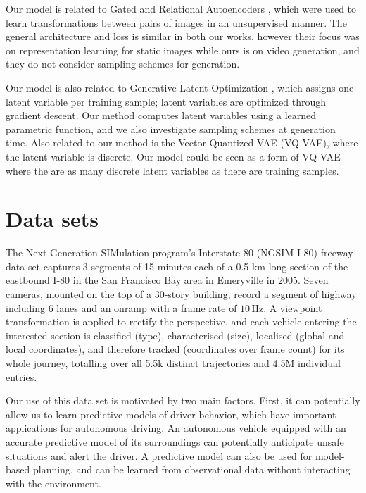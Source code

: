 \documentclass{article}
\begin{document}
Our model is related to Gated and Relational Autoencoders \citep{RelationalAE, GAE}, which were used to learn transformations between pairs of images in an unsupervised manner.
The general architecture and loss is similar in both our works, however their focus was on representation learning for static images while ours is on video generation, and they do not consider sampling schemes for generation.

Our model is also related to Generative Latent Optimization \citep{GLO}, which assigns one latent variable per training sample; latent variables are optimized through gradient descent.
Our method computes latent variables using a learned parametric function, and we also investigate sampling schemes at generation time.
Also related to our method is the Vector-Quantized VAE \citep{VQVAE} (VQ-VAE), where the latent variable is discrete.
Our model could be seen as a form of VQ-VAE where the are as many discrete latent variables as there are training samples.

\section{Data sets}

The Next Generation SIMulation program's Interstate 80 (NGSIM I-80) freeway data set \cite{halkias2006ngsim} captures 3 segments of 15 minutes each of a 0.5 km long section of the eastbound I-80 in the San Francisco Bay area in Emeryville in 2005.
Seven cameras, mounted on the top of a 30-story building, record a segment of highway including 6 lanes and an onramp with a frame rate of $10\,\text{Hz}$.
A viewpoint transformation is applied to rectify the perspective, and each vehicle entering the interested section is classified (type), characterised (size), localised (global and local coordinates), and therefore tracked (coordinates over frame count) for its whole journey, totalling over all 5.5k distinct trajectories and 4.5M individual entries.

Our use of this data set is motivated by two main factors.
First, it can potentially allow us to learn predictive models of driver behavior, which have important applications for autonomous driving.
An autonomous vehicle equipped with an accurate predictive model of its surroundings can potentially anticipate unsafe situations and alert the driver.
A predictive model can also be used for model-based planning, and can be learned from observational data without interacting with the environment.
\end{document}
